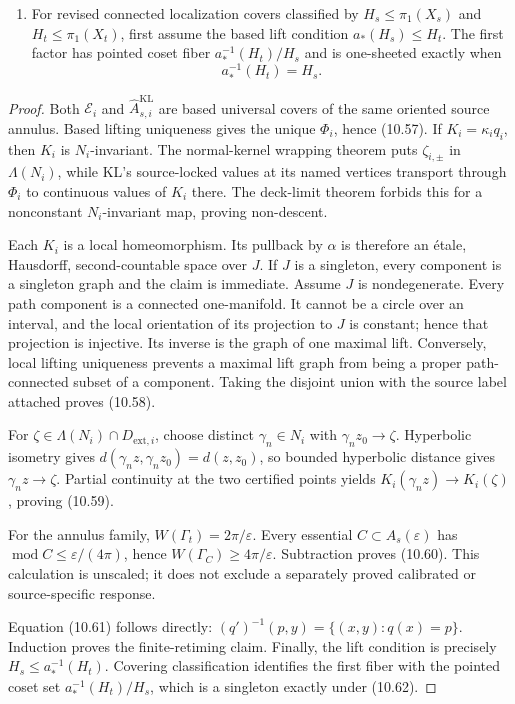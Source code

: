 \begin{proposition}
\begin{enumerate}
\[
(q')^{-1}(p,y)\cong q^{-1}(p). \tag{10.61}
\]
Hence no finite retiming inside the unchanged exact equalizer tower turns an infinite first factor into a one-sheet factor.
\item For revised connected localization covers classified by \(H_s\le\pi_1(X_s)\) and \(H_t\le\pi_1(X_t)\), first assume the based lift condition \(a_*(H_s)\le H_t\). The first factor has pointed coset fiber \(a_*^{-1}(H_t)/H_s\) and is one-sheeted exactly when
\[
a_*^{-1}(H_t)=H_s. \tag{10.62}
\]
\end{enumerate}
\end{proposition}

\begin{proof}
Both \(\mathcal E_i\) and \(\hat A^{\mathrm{KL}}_{s,i}\) are based universal covers of the same oriented source annulus. Based lifting uniqueness gives the unique \(\Phi_i\), hence (10.57). If \(K_i=\kappa_iq_i\), then \(K_i\) is \(N_i\)-invariant. The normal-kernel wrapping theorem puts \(\zeta_{i,\pm}\) in \(\Lambda(N_i)\), while KL's source-locked values at its named vertices transport through \(\Phi_i\) to continuous values of \(K_i\) there. The deck-limit theorem forbids this for a nonconstant \(N_i\)-invariant map, proving non-descent.

Each \(K_i\) is a local homeomorphism. Its pullback by \(\alpha\) is therefore an \'etale, Hausdorff, second-countable space over \(J\). If \(J\) is a singleton, every component is a singleton graph and the claim is immediate. Assume \(J\) is nondegenerate. Every path component is a connected one-manifold. It cannot be a circle over an interval, and the local orientation of its projection to \(J\) is constant; hence that projection is injective. Its inverse is the graph of one maximal lift. Conversely, local lifting uniqueness prevents a maximal lift graph from being a proper path-connected subset of a component. Taking the disjoint union with the source label attached proves (10.58).

For \(\zeta\in\Lambda(N_i)\cap D_{\mathrm{ext},i}\), choose distinct \(\gamma_n\in N_i\) with \(\gamma_n z_0\to\zeta\). Hyperbolic isometry gives \(d(\gamma_n z,\gamma_n z_0)=d(z,z_0)\), so bounded hyperbolic distance gives \(\gamma_n z\to\zeta\). Partial continuity at the two certified points yields \(K_i(\gamma_n z)\to K_i(\zeta)\), proving (10.59).

For the annulus family, \(W(\Gamma_t)=2\pi/\varepsilon\). Every essential \(C\subset A_s(\varepsilon)\) has \(\operatorname{mod}C\le\varepsilon/(4\pi)\), hence \(W(\Gamma_C)\ge 4\pi/\varepsilon\). Subtraction proves (10.60). This calculation is unscaled; it does not exclude a separately proved calibrated or source-specific response.

Equation (10.61) follows directly: \((q')^{-1}(p,y)=\{(x,y):q(x)=p\}\). Induction proves the finite-retiming claim. Finally, the lift condition is precisely \(H_s\le a_*^{-1}(H_t)\). Covering classification identifies the first fiber with the pointed coset set \(a_*^{-1}(H_t)/H_s\), which is a singleton exactly under (10.62).
\end{proof}